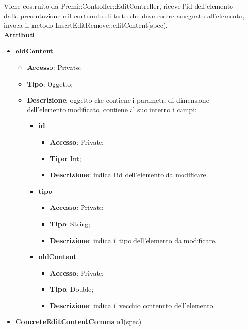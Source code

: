{{{		\indent Viene costruito da Premi::Controller::EditController, riceve l’id dell’elemento dalla presentazione e il contenuto di testo che deve essere assegnato all'elemento, invoca il metodo InsertEditRemove::editContent(spec).\\
			\textbf{Attributi}
			\begin{itemize}
				\item \textbf{oldContent}
				\begin{itemize}
				\item \textbf{Accesso}: Private;
				\item \textbf{Tipo}: Oggetto;
				\item \textbf{Descrizione}: oggetto che contiene i parametri di dimensione dell'elemento modificato, contiene al suo interno i campi:
				\begin{itemize}
				\item \textbf{id}
				\begin{itemize}
					\item \textbf{Accesso}: Private;
					\item \textbf{Tipo}: Int;
					\item \textbf{Descrizione}: indica l'id dell’elemento da modificare.
				\end{itemize}
				\item \textbf{tipo}
				\begin{itemize}
					\item \textbf{Accesso}: Private;
					\item \textbf{Tipo}: String;
					\item \textbf{Descrizione}: indica il tipo dell’elemento da modificare.
				\end{itemize}
				\item \textbf{oldContent}
				\begin{itemize}
					\item \textbf{Accesso}: Private;
					\item \textbf{Tipo}: Double;
					\item \textbf{Descrizione}: indica il vecchio contenuto dell’elemento.
				\end{itemize}
			\end{itemize}
				\end{itemize}
				\end{itemize}
			\begin{itemize}
				\item \textbf{ConcreteEditContentCommand}(spec)
				\begin{itemize}

\end{itemize}
\end{itemize}}}}
